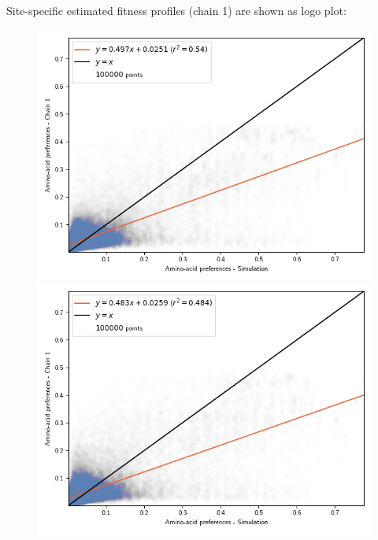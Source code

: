 \documentclass{article}
\begin{document}
	Site-specific estimated fitness profiles (chain 1) are shown as logo plot:

	
	

	\begin{figure}[H]
		\centering
		\begin{minipage}{0.49\linewidth}
			\includegraphics[width=\linewidth, page=1]{simulations/SimuPoly_SiteMutSelBranchNe_ProfileCorrelation.png}
		\end{minipage} \hfill
		\begin{minipage}{0.49\linewidth}
			\includegraphics[width=\linewidth, page=1]{simulations/SimuPoly_SiteMutSel_ProfileCorrelation.png}

\end{minipage}
\end{figure}
\end{document}
